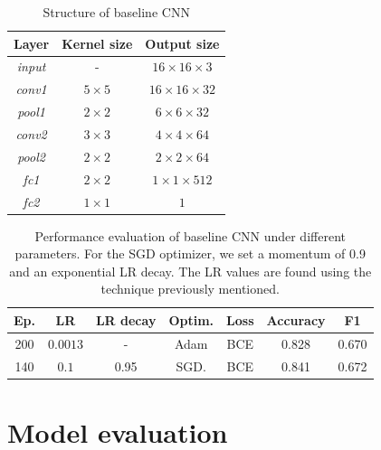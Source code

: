 \documentclass[10pt,conference,compsocconf]{IEEEtran}
\begin{document}
\begin{table}[h]
    \centering
    \begin{tabular}{|c|c|c|}
        \hline
        Layer & Kernel size     & Output size  \\ \hline
        \textit{input} & -               & $16 \times 16 \times 3$\\ \hline
        \textit{conv1} & $5 \times 5$    & $16 \times 16 \times 32$ \\ \hline
        \textit{pool1} & $2 \times 2$    & $6 \times 6 \times 32 $\\ \hline
        \textit{conv2} & $3 \times 3$    & $ 4 \times 4 \times 64$ \\ \hline
        \textit{pool2} & $2 \times 2$    & $2 \times 2 \times 64$ \\ \hline
        \textit{fc1}   & $2 \times 2$    & $1 \times 1 \times 512$ \\ \hline
        \textit{fc2}   & $1 \times 1$    & $1$ \\ \hline
    \end{tabular}
    \caption{Structure of baseline CNN}
    \label{tab:cnn_struct}
\end{table}

\begin{table}[ht]
    \centering
    \begin{tabular}{|c|c|c|c|c|c|c|}
    \hline
        Ep.     & LR        & LR decay & Optim.     & Loss & Accuracy & F1      \\ \hline \hline
        200     & $0.0013$  & -        & Adam       & BCE  & 0.828   & 0.670   \\ \hline %
        140     & $0.1$     & 0.95     & SGD.       & BCE  & 0.841   & 0.672   \\ \hline %
        
    \end{tabular}
    \caption{Performance evaluation of baseline CNN under different parameters. For the SGD optimizer, we set a momentum of 0.9 and an exponential LR decay. The LR values are found using the technique previously mentioned.}
    \label{tab:cnn-perf}
\end{table}

\section{Model evaluation}
\end{document}
